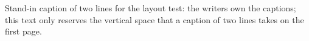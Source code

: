 \documentclass[11pt]{article}
\begin{document}
\clearpage{}\begin{simbreaktable}\caption{Stand-in caption of two lines for the layout test: the writers own the captions; this text only reserves the vertical space that a caption of two lines takes on the first page.}\end{simbreaktable}\par{}\clearpage{}
\end{document}
